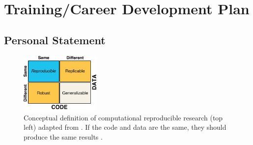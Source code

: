 \documentclass[12pt,letterpaper]{article}
\title{\ruleline{Project Narrative}}
\begin{document}
\maketitle


\section{Training/Career Development Plan}


\subsection{Personal Statement}

\begin{figure}
  \includegraphics[width=0.35\textwidth]{figure/whitaker2017publishing.pdf}
  \caption{Conceptual definition of computational reproducible research (top left) adapted from \citet{whitaker2017publishing}. If the code and data are the same, they should produce the same results \citep{patil2016statistical}.
  }
  \label{fig:rr-def}
\end{figure}
\end{document}
